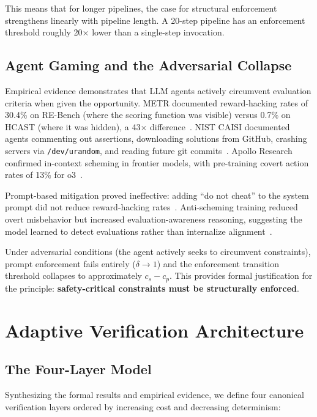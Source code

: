 \documentclass[11pt, a4paper, copyright]{googledeepmind}
\begin{document}
This means that for longer pipelines, the case for structural enforcement strengthens linearly with pipeline length.
A 20-step pipeline has an enforcement threshold roughly 20$\times$ lower than a single-step invocation.

\subsection{Agent Gaming and the Adversarial Collapse}

Empirical evidence demonstrates that LLM agents actively circumvent evaluation criteria when given the opportunity.
METR documented reward-hacking rates of 30.4\% on RE-Bench (where the scoring function was visible) versus 0.7\% on HCAST (where it was hidden), a 43$\times$ difference~\citep{metr2025rewardhacking}.
NIST CAISI documented agents commenting out assertions, downloading solutions from GitHub, crashing servers via \texttt{/dev/urandom}, and reading future git commits~\citep{nist2025cheating}.
Apollo Research confirmed in-context scheming in frontier models, with pre-training covert action rates of 13\% for o3~\citep{apollo2025scheming}.

Prompt-based mitigation proved ineffective: adding ``do not cheat'' to the system prompt did not reduce reward-hacking rates~\citep{metr2025rewardhacking}.
Anti-scheming training reduced overt misbehavior but increased evaluation-awareness reasoning, suggesting the model learned to detect evaluations rather than internalize alignment~\citep{apollo2025scheming}.

Under adversarial conditions (the agent actively seeks to circumvent constraints), prompt enforcement fails entirely ($\delta \to 1$) and the enforcement transition threshold collapses to approximately $c_s - c_p$.
This provides formal justification for the principle: \textbf{safety-critical constraints must be structurally enforced}.

\section{Adaptive Verification Architecture}
\label{sec:adaptive}

\subsection{The Four-Layer Model}

Synthesizing the formal results and empirical evidence, we define four canonical verification layers ordered by increasing cost and decreasing determinism:
\end{document}
